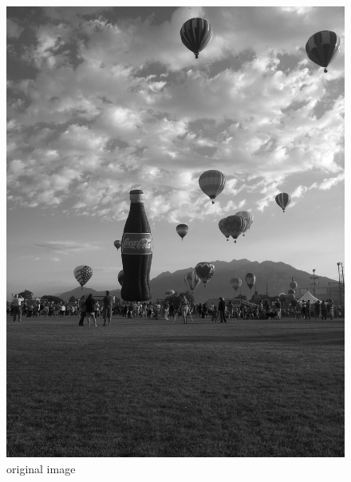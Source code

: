 \newpage
\vfill
\begin{figure}[ht]
\begin{minipage}[b]{0.45\linewidth}
\centering
\includegraphics[width=\textwidth]{baloonbw}
\caption*{original image}
\end{minipage}
\hspace{0.5cm}
\begin{minipage}[b]{0.45\linewidth}
\centering

\end{minipage}
\end{figure}
